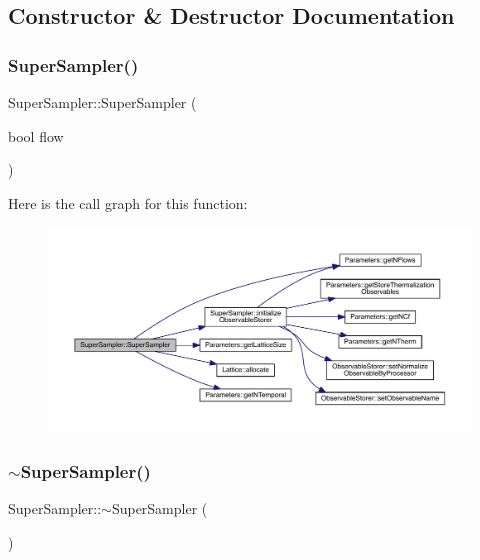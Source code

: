 \subsection{Constructor \& Destructor Documentation}
\mbox{\label{class_super_sampler_a6bf01b68f9befc5bf01c822e28c0c88d}} 
\subsubsection{\texorpdfstring{SuperSampler()}{SuperSampler()}}
{\footnotesize\ttfamily Super\+Sampler\+::\+Super\+Sampler (\begin{DoxyParamCaption}\item[{bool}]{flow }\end{DoxyParamCaption})}

Here is the call graph for this function\+:\nopagebreak
\begin{figure}[H]
\begin{center}
\leavevmode
\includegraphics[width=350pt]{class_super_sampler_a6bf01b68f9befc5bf01c822e28c0c88d_cgraph}
\end{center}
\end{figure}
\mbox{\label{class_super_sampler_a55e62dd765b7e85d629fb4ff07208d6d}} 
\subsubsection{\texorpdfstring{$\sim$SuperSampler()}{~SuperSampler()}}
{\footnotesize\ttfamily Super\+Sampler\+::$\sim$\+Super\+Sampler (\begin{DoxyParamCaption}{ }\end{DoxyParamCaption})}



